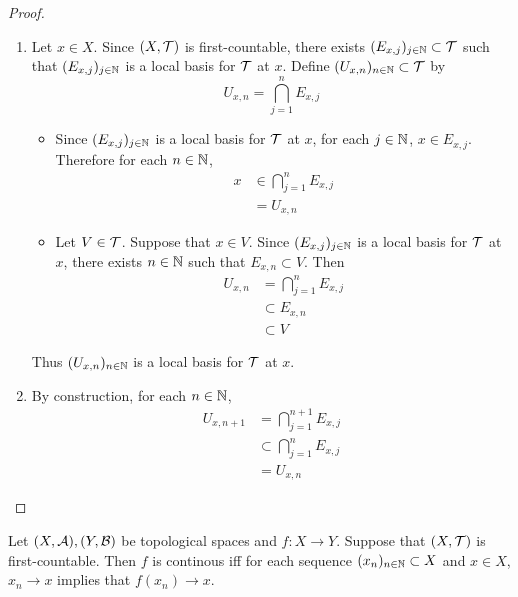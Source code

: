 \documentclass{book}
\begin{document}
	\begin{proof}\
		\begin{enumerate}
			\item Let $x \in X$. Since $(X, \mathcal{T})$ is first-countable, there exists $(E_{x, j})_{j \in \mathbb{N}} \subset \mathcal{T}$ such that $(E_{x, j})_{j \in \mathbb{N}}$ is a local basis for $\mathcal{T}$ at $x$. Define $(U_{x,n})_{n \in \mathbb{N}} \subset \mathcal{T}$ by 
			$$U_{x,n} = \bigcap_{j=1}^n E_{x,j}$$
			\begin{itemize}
				\item Since $(E_{x,j})_{j \in \mathbb{N}}$ is a local basis for $\mathcal{T}$ at $x$, for each $j \in \mathbb{N}$, $x \in E_{x,j}$. Therefore for each $n \in \mathbb{N}$, 
				\begin{align*}
					x 
					& \in \bigcap_{j=1}^n E_{x, j} \\
					& = U_{x,n}
				\end{align*}
				\item Let $V \in \mathcal{T}$. Suppose that $x \in V$. Since $(E_{x,j})_{j \in \mathbb{N}}$ is a local basis for $\mathcal{T}$ at $x$, there exists $n \in \mathbb{N}$ such that $E_{x,n} \subset V$. Then 
				\begin{align*}
					U_{x,n}
					& = \bigcap_{j=1}^n E_{x, j} \\
					& \subset E_{x, n} \\
					& \subset V
				\end{align*}
			\end{itemize}
			Thus $(U_{x,n})_{n \in \mathbb{N}}$ is a local basis for $\mathcal{T}$ at $x$. 
			\item By construction, for each $n \in \mathbb{N}$,
			\begin{align*}
				U_{x, n+1}
				& = \bigcap_{j=1}^{n+1} E_{x, j} \\
				& \subset \bigcap_{j=1}^n E_{x, j} \\
				& = U_{x, n}
			\end{align*}
		\end{enumerate}
	\end{proof}

	\begin{ex} 
		Let $(X, \mathcal{A}), (Y, \mathcal{B})$ be topological spaces and $f: X \rightarrow Y$. Suppose that $(X, \mathcal{T})$ is first-countable. Then $f$ is continous iff for each sequence $(x_n)_{n \in \mathbb{N}} \subset X$ and $x \in X$, $x_n \rightarrow x$ implies that $f(x_n) \rightarrow x$.
	\end{ex}
\end{document}
